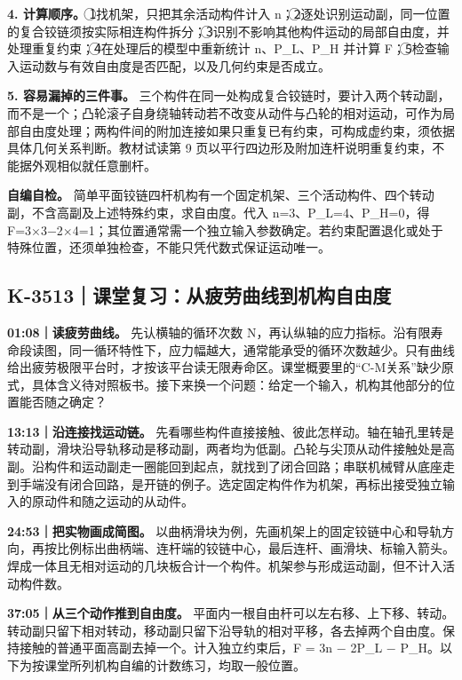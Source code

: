 \documentclass[zihao=5,a4paper,UTF8,fontset=fandol]{ctexart}
\begin{document}
\textbf{4. 计算顺序。} \textcircled{1}找机架，只把其余活动构件计入 n；\textcircled{2}逐处识别运动副，同一位置的复合铰链须按实际相连构件拆分；\textcircled{3}识别不影响其他构件运动的局部自由度，并处理重复约束；\textcircled{4}在处理后的模型中重新统计 n、P\_L、P\_H 并计算 F；\textcircled{5}检查输入运动数与有效自由度是否匹配，以及几何约束是否成立。


\textbf{5. 容易漏掉的三件事。} 三个构件在同一处构成复合铰链时，要计入两个转动副，而不是一个；凸轮滚子自身绕轴转动若不改变从动件与凸轮的相对运动，可作为局部自由度处理；两构件间的附加连接如果只重复已有约束，可构成虚约束，须依据具体几何关系判断。教材试读第 9 页以平行四边形及附加连杆说明重复约束，不能据外观相似就任意删杆。


\textbf{自编自检。} 简单平面铰链四杆机构有一个固定机架、三个活动构件、四个转动副，不含高副及上述特殊约束，求自由度。代入 n=3、P\_L=4、P\_H=0，得 F=3$\times$3$-$2$\times$4=1；其位置通常需一个独立输入参数确定。若约束配置退化或处于特殊位置，还须单独检查，不能只凭代数式保证运动唯一。





\subsection{K-3513｜课堂复习：从疲劳曲线到机构自由度}
\label{k-3513}

\textbf{01:08｜读疲劳曲线。} 先认横轴的循环次数 N，再认纵轴的应力指标。沿有限寿命段读图，同一循环特性下，应力幅越大，通常能承受的循环次数越少。只有曲线给出疲劳极限平台时，才按该平台读无限寿命区。课堂概要里的“C-M关系”缺少原式，具体含义待对照板书。接下来换一个问题：给定一个输入，机构其他部分的位置能否随之确定？


\textbf{13:13｜沿连接找运动链。} 先看哪些构件直接接触、彼此怎样动。轴在轴孔里转是转动副，滑块沿导轨移动是移动副，两者均为低副。凸轮与尖顶从动件接触处是高副。沿构件和运动副走一圈能回到起点，就找到了闭合回路；串联机械臂从底座走到手端没有闭合回路，是开链的例子。选定固定构件作为机架，再标出接受独立输入的原动件和随之运动的从动件。


\textbf{24:53｜把实物画成简图。} 以曲柄滑块为例，先画机架上的固定铰链中心和导轨方向，再按比例标出曲柄端、连杆端的铰链中心，最后连杆、画滑块、标输入箭头。焊成一体且无相对运动的几块板合计一个构件。机架参与形成运动副，但不计入活动构件数。


\textbf{37:05｜从三个动作推到自由度。} 平面内一根自由杆可以左右移、上下移、转动。转动副只留下相对转动，移动副只留下沿导轨的相对平移，各去掉两个自由度。保持接触的普通平面高副去掉一个。计入独立约束后，F = 3n $-$ 2P\_L $-$ P\_H。以下为按课堂所列机构自编的计数练习，均取一般位置。
\end{document}
